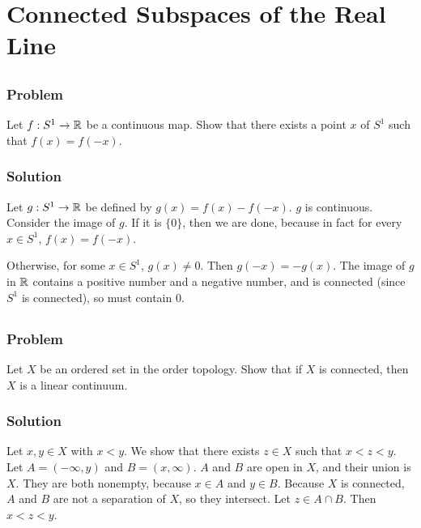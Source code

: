 \setcounter{section}{23} %
\section{Connected Subspaces of the Real Line}
\label{sec-connected-subspaces-real}


\setcounter{subsection}{1} %
\subsection{}

\subsubsection{Problem}
Let $f : S^1 \to \mathbb R$ be a continuous map. Show that there exists a point $x$ of $S^1$ such that $f(x) = f(-x)$.

\subsubsection{Solution}
Let $g : S^1 \to \mathbb R$ be defined by $g(x) = f(x) - f(-x)$. $g$ is continuous. Consider the image of $g$. If it is $\{0\}$, then we are done, because in fact for every $x \in S^1$, $f(x) = f(-x)$.

Otherwise, for some $x \in S^1$, $g(x) \neq 0$. Then $g(-x) = -g(x)$. The image of $g$ in $\mathbb R$ contains a positive number and a negative number, and is connected (since $S^1$ is connected), so must contain $0$.


\setcounter{subsection}{3} %
\subsection{}

\subsubsection{Problem}
Let $X$ be an ordered set in the order topology. Show that if $X$ is connected, then $X$ is a linear continuum.

\subsubsection{Solution}
Let $x, y \in X$ with $x < y$. We show that there exists $z \in X$ such that $x < z < y$. Let $A = (-\infty, y)$ and $B = (x, \infty)$. $A$ and $B$ are open in $X$, and their union is $X$. They are both nonempty, because $x \in A$ and $y \in B$. Because $X$ is connected, $A$ and $B$ are not a separation of $X$, so they intersect. Let $z \in A \cap B$. Then $x < z < y$.

